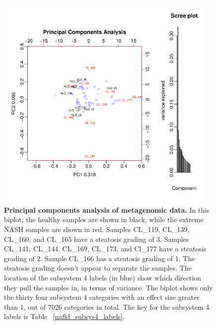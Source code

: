 \begin{figure}[h]
\begin{center}
\includegraphics[width=0.95\textwidth]{metagenomic_pca.png}
\caption[Principal components analysis of metagenomic data.]{\textbf{Principal components analysis of metagenomic data.} In this biplot, the healthy samples are shown in black, while the extreme NASH samples are shown in red. Samples CL\_119, CL\_139, CL\_160, and CL\_165 have a steatosis grading of 3. Samples CL\_141, CL\_144, CL\_169, CL\_173, and Cl\_177 have a steatosis grading of 2. Sample CL\_166 has a steatosis grading of 1. The steatosis grading doesn't appear to separate the samples. The location of the subsystem 4 labels (in blue) show which direction they pull the samples in, in terms of variance. The biplot shows only the thirty four subsystem 4 categories with an effect size greater than 1, out of 7026 categories in total. The key for the subsystem 4 labels is Table ~\ref{nafld_subsys4_labels}.}
\label{nafld_metagenomic_pca}
\end{center}
\end{figure}

